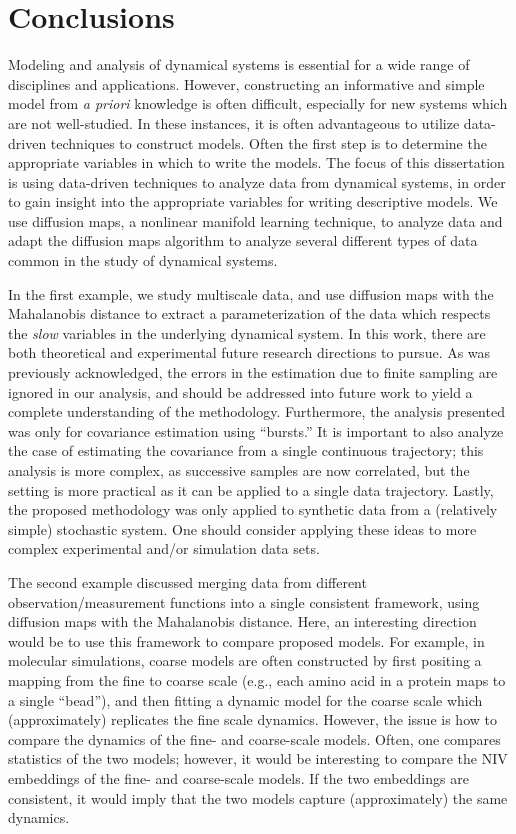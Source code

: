
\chapter{Conclusions \label{ch:conclusion}}

Modeling and analysis of dynamical systems is essential for a wide range of disciplines and applications. 
%
However, constructing an informative and simple model from {\em a priori} knowledge is often difficult, especially for new systems which are not well-studied. 
%
In these instances, it is often advantageous to utilize data-driven techniques to construct models.
%
Often the first step is to determine the appropriate variables in which to write the models. 
%
The focus of this dissertation is using data-driven techniques to analyze data from dynamical systems, in order to gain insight into the appropriate variables for writing descriptive models. 
%
We use diffusion maps, a nonlinear manifold learning technique, to analyze data and adapt the diffusion maps algorithm to analyze several different types of data common in the study of dynamical systems. 

In the first example, we study multiscale data, and use diffusion maps with the Mahalanobis distance to extract a parameterization of the data which respects the {\em slow} variables in the underlying dynamical system. 
%
In this work, there are both theoretical and experimental future research directions to pursue. 
%
As was previously acknowledged, the errors in the estimation due to finite sampling are ignored in our analysis, and should be addressed into future work to yield a complete understanding of the methodology. 
%
Furthermore, the analysis presented was only for covariance estimation using ``bursts.''
%
It is important to also analyze the case of estimating the covariance from a single continuous trajectory; this analysis is more complex, as successive samples are now correlated, but the setting is more practical as it can be applied to a single data trajectory.
%
Lastly, the proposed methodology was only applied to synthetic data from a (relatively simple) stochastic system. 
%
One should consider applying these ideas to more complex experimental and/or simulation data sets. 

The second example discussed merging data from different observation/measurement functions into a single consistent framework, using diffusion maps with the Mahalanobis distance. 
%
Here, an interesting direction would be to use this framework to compare proposed models. 
%
For example, in molecular simulations, coarse models are often constructed by first positing a mapping from the fine to coarse scale (e.g., each amino acid in a protein maps to a single ``bead''), and then fitting a dynamic model for the coarse scale which (approximately) replicates the fine scale dynamics. 
%
However, the issue is how to compare the dynamics of the fine- and coarse-scale models. 
%
Often, one compares statistics of the two models; however, it would be interesting to compare the NIV embeddings of the fine- and coarse-scale models. 
%
If the two embeddings are consistent, it would imply that the two models capture (approximately) the same dynamics. 


